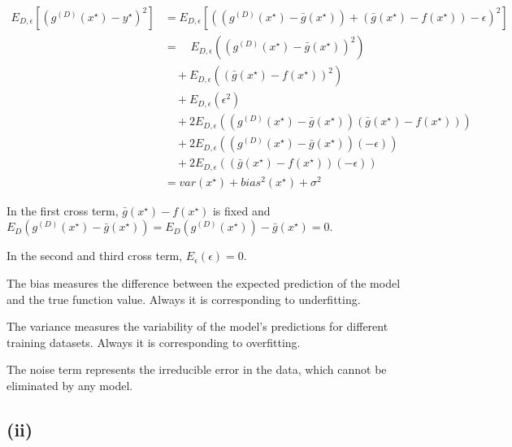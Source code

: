\documentclass[11pt]{article}
\begin{document}
$$
\begin{aligned}
E_{D, \epsilon} [(g^{(D)}(x^\star) - y^\star)^2]
&= E_{D, \epsilon} [((g^{(D)}(x^\star) - \bar{g}(x^\star)) + (\bar{g}(x^\star) - f(x^\star)) - \epsilon)^2] \\
&=\quad  E_{D, \epsilon}((g^{(D)}(x^\star) - \bar{g}(x^\star))^2) \\
&\quad + E_{D, \epsilon}((\bar{g}(x^\star) - f(x^\star))^2) \\
&\quad + E_{D, \epsilon}(\epsilon^2) \\
&\quad + 2 E_{D, \epsilon}((g^{(D)}(x^\star) - \bar{g}(x^\star))(\bar{g}(x^\star) - f(x^\star))) \\
&\quad + 2 E_{D, \epsilon}((g^{(D)}(x^\star) - \bar{g}(x^\star))(-\epsilon)) \\
&\quad + 2 E_{D, \epsilon}((\bar{g}(x^\star) - f(x^\star))(-\epsilon)) \\
&= var(x^\star) + bias^2(x^\star) + \sigma^2
\end{aligned}
$$

In the first cross term, $\bar{g}(x^\star) - f(x^\star)$ is fixed and $E_D(g^{(D)}(x^\star) - \bar{g}(x^\star)) = E_{D}(g^{(D)}(x^\star)) - \bar{g}(x^\star) = 0$.

In the second and third cross term, $E_\epsilon(\epsilon) = 0$.

The bias measures the difference between the expected prediction of the model and the true function value. Always it is corresponding to underfitting.

The variance measures the variability of the model's predictions for different training datasets. Always it is corresponding to overfitting.

The noise term represents the irreducible error in the data, which cannot be eliminated by any model.

\subsection*{(ii)}
\end{document}
